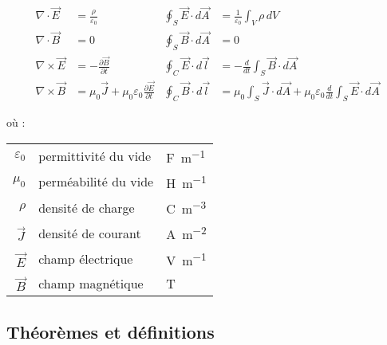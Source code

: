 \begin{subequations}
    \begin{align}
        \nabla \cdot \vec{E}  & = \frac{\rho}{\varepsilon_0}                                              & \oint_{S} \vec{E} \cdot d\vec{A} & = \frac{1}{\varepsilon_0} \int_{V} \rho \, dV                                                              \\[1em]
        \nabla \cdot \vec{B}  & = 0                                                                       & \oint_{S} \vec{B} \cdot d\vec{A} & = 0                                                                                                        \\[1em]
        \nabla \times \vec{E} & = -\frac{\partial \vec{B}}{\partial t}                                    & \oint_{C} \vec{E} \cdot d\vec{l} & = -\frac{d}{dt} \int_{S} \vec{B} \cdot d\vec{A}                                                            \\[1em]
        \nabla \times \vec{B} & = \mu_0 \vec{J} + \mu_0 \varepsilon_0 \frac{\partial \vec{E}}{\partial t} & \oint_{C} \vec{B} \cdot d\vec{l} & = \mu_0 \int_{S} \vec{J} \cdot d\vec{A} + \mu_0 \varepsilon_0 \frac{d}{dt} \int_{S} \vec{E} \cdot d\vec{A}
    \end{align}
\end{subequations}

\vspace{1em}

où :

\begin{tabular}{rll}
    $\varepsilon_0$ & permittivité du vide & \si{\farad\per\meter}          \\
    $\mu_0$         & perméabilité du vide & \si{\henry\per\meter}          \\
    $\rho$          & densité de charge    & \si{\coulomb\per\meter\cubed}  \\
    $\vec{J}$       & densité de courant   & \si{\ampere\per\meter\squared} \\
    $\vec{E}$       & champ électrique     & \si{\volt\per\meter}           \\
    $\vec{B}$       & champ magnétique     & \si{\tesla}                    \\
\end{tabular}


\subsection{Théorèmes et définitions}

